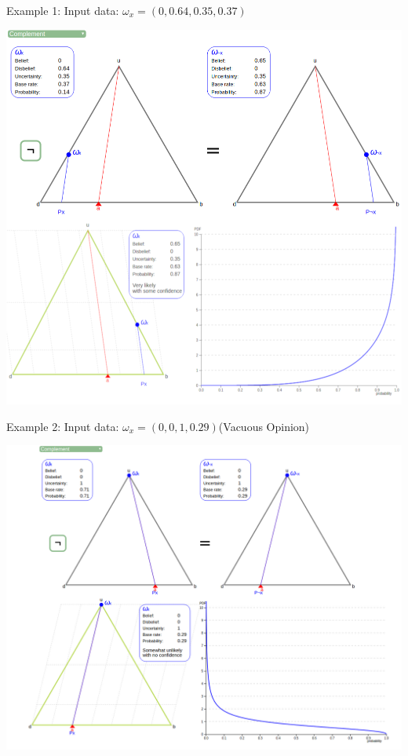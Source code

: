 \documentclass[UTF8]{article}
\newcommand{\opinion}[5]{$\omega_{#1} = (#2, #3, #4, #5)$}
\begin{document}
Example 1:
Input data: 
\opinion{x}{0}{0.64}{0.35}{0.37}
\begin{center}
\includegraphics[width=6in]{images/comp1.png}
\end{center}
Example 2:
Input data: 
\opinion{x}{0}{0}{1}{0.29}(Vacuous Opinion)
\begin{center}
\includegraphics[width=6in]{images/comp2.png}
\end{center}
\end{document}
